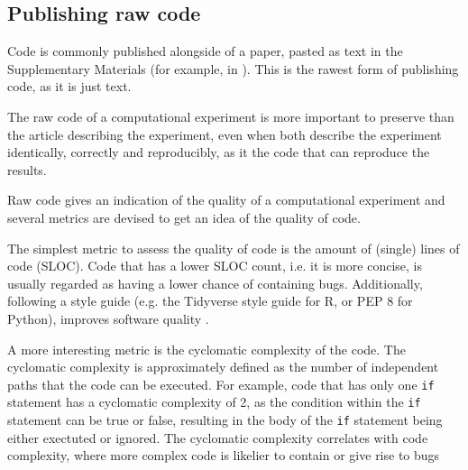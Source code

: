 \subsection{Publishing raw code}

Code is commonly published alongside of a 
paper, pasted as text in the Supplementary Materials 
(for example, in \cite{labrecque2019interpretation}).
This is the rawest form of publishing code,
as it is just text.


The raw code of a computational experiment is
more important to preserve than the article describing
the experiment, even when both describe the experiment identically,
correctly and reproducibly, 
as it the code that can reproduce the results.


Raw code gives an indication of the quality 
of a computational experiment and several metrics are
devised to get an idea of the quality of code.

The simplest metric to assess the quality of code is 
the amount of (single) lines of code (SLOC). 
Code that has a lower SLOC count, i.e. it is more concise,
is usually regarded as having a lower chance of containing bugs.
Additionally, following a style guide 
(e.g. the Tidyverse style guide \cite{wickham2019advanced} for R,
or PEP 8 \cite{van2001pep} for Python), 
improves software quality \cite{fang2001}.

A more interesting metric is the cyclomatic complexity of the code.
The cyclomatic complexity is approximately defined 
as the number of independent paths that
the code can be executed. 
For example, code that has only one \verb|if| statement
has a cyclomatic complexity of 2, as the condition within the \verb|if|
statement can be true or false,
resulting in the body of the \verb|if| statement being either
exectuted or ignored.
The cyclomatic complexity correlates with code complexity,
where more complex code is likelier to contain or give rise to bugs 
\cite{abd2018calculating,chen2019empirical,zimmermann2008predicting}

